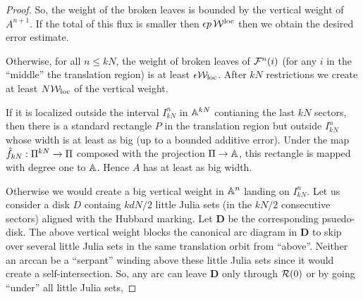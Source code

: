 {{\begin{proof}
So, the weight of the broken leaves is bounded by the vertical weight
of $A^{n+1}$.  If the total of this flux  is smaller then ${\epsilon} p  \, {\mathcal W}^{\mathrm{loc}}$ then 
we obtain  the desired error estimate. 

Otherwise, for all  $n\leq k N$, the weight of broken leaves of
${\mathcal F}^n(i)$ (for any $i$ in the ``middle''  the translation region) is at
least ${\epsilon}{\mathcal W}_{\mathrm{loc}}$. 
After $kN$ restrictions we create at least $N{\mathcal W}_{\mathrm{loc}}$ of the vertical
weight.  

If it is localized outside the interval $I^n_{kN}$ in ${\Bbb A}^{kN}$ contianing the
last $kN$ sectors, 
then there is  a standard rectangle $P$ in the translation
region but outside $I^n_{kN}$ whose width is at least as big  (up to a bounded additive
error).  Under the map 
$\hat f_{kN}: \Pi^{kN} \rightarrow \Pi$ composed with the projection $\Pi\rightarrow {\Bbb A}$, 
this rectangle is mapped with degree one to ${\Bbb A}$.
Hence  $A$ has at least as big width.  
%

Otherwise we would create a big vertical weight in ${\Bbb A}^n$ landing on
$I^n_{kN}$.  Let us consider a disk $D$ containg  $kdN/2$ little Julia
sets (in the $kN/2$ consecutive sectors) aligned with the Hubbard
marking.  Let $\mathbf D$ be the corresponding psuedo-disk. 
The above vertical weight blocks the canonical arc diagram in $\mathbf
D$ to skip over several little Julia sets in the same translation
orbit from ``above''. 
 Neither an arccan be a ``serpant'' winding above these little Julia
 sets
since it would create a self-intersection. So, any arc can leave
$\mathbf D$ only through ${\mathcal R}(0)$ or  by going ``under'' all little Julia sets,


\end{proof}}}

